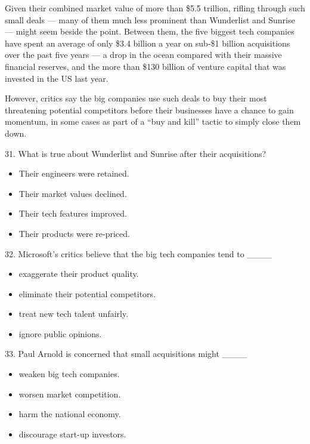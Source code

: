 \documentclass[UTF8,11pt]{ctexart}
\begin{document}
Given their combined market value of more than \$5.5 trillion, rifling through such small deals — many of them much less prominent than Wunderlist and Sunrise — might seem beside the point. Between them, the five biggest tech companies have spent an average of only \$3.4 billion a year on sub-\$1 billion acquisitions over the past five years — a drop in the ocean compared with their massive financial reserves, and the more than \$130 billion of venture capital that was invested in the US last year.


However, critics say the big companies use such deals to buy their most threatening potential competitors before their businesses have a chance to gain momentum, in some cases as part of a “buy and kill” tactic to simply close them down.


31. What is true about Wunderlist and Sunrise after their acquisitions?


\begin{itemize}[leftmargin=2em,itemsep=.2em,topsep=.4em]\item[A.] Their engineers were retained.
\item[B.] Their market values declined.
\item[C.] Their tech features improved.
\item[D.] Their products were re-priced.
\end{itemize}

32. Microsoft’s critics believe that the big tech companies tend to \_\_\_\_


\begin{itemize}[leftmargin=2em,itemsep=.2em,topsep=.4em]\item[A.] exaggerate their product quality.
\item[B.] eliminate their potential competitors.
\item[C.] treat new tech talent unfairly.
\item[D.] ignore public opinions.
\end{itemize}

33. Paul Arnold is concerned that small acquisitions might \_\_\_\_


\begin{itemize}[leftmargin=2em,itemsep=.2em,topsep=.4em]\item[A.] weaken big tech companies.
\item[B.] worsen market competition.
\item[C.] harm the national economy.
\item[D.] discourage start-up investors.
\end{itemize}
\end{document}

